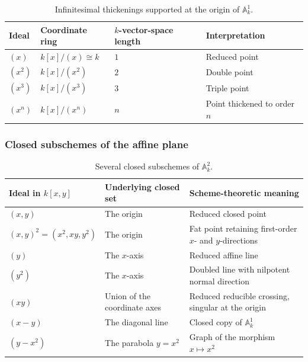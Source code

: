 \documentclass[12pt,a4paper]{article}
\providecommand{\A}{\mathbb A}
\theoremstyle{notespace}
\begin{document}
\begin{table}[htbp]
	\centering
	\renewcommand{\arraystretch}{1.45}
	\begin{tabular}{
			|>{\raggedright\arraybackslash}p{3.7cm}
			|>{\raggedright\arraybackslash}p{4.8cm}
			|>{\centering\arraybackslash}p{3.5cm}
			|>{\raggedright\arraybackslash}p{4.0cm}|
		}
		\hline
		\textbf{Ideal}
		&
		\textbf{Coordinate ring}
		&
		\textbf{\(k\)-vector-space length}
		&
		\textbf{Interpretation}
		\\
		\hline
		
		\((x)\)
		&
		\(\displaystyle k[x]/(x)\cong k\)
		&
		\(1\)
		&
		Reduced point
		\\
		\hline
		
		\((x^2)\)
		&
		\(\displaystyle k[x]/(x^2)\)
		&
		\(2\)
		&
		Double point
		\\
		\hline
		
		\((x^3)\)
		&
		\(\displaystyle k[x]/(x^3)\)
		&
		\(3\)
		&
		Triple point
		\\
		\hline
		
		\((x^n)\)
		&
		\(\displaystyle k[x]/(x^n)\)
		&
		\(n\)
		&
		Point thickened to order \(n\)
		\\
		\hline
	\end{tabular}
	\caption{Infinitesimal thickenings supported at the origin of \(\mathbb{A}^1_k\).}
	\label{tab:infinitesimal-thickenings-origin}
\end{table}

\subsubsection{Closed subschemes of the affine plane}

\begin{table}[htbp]
	\centering
	\renewcommand{\arraystretch}{1.45}
	\begin{tabular}{|p{4.2cm}|p{4.6cm}|p{6.1cm}|}
		\hline
		\textbf{Ideal in \(k[x,y]\)}
		&
		\textbf{Underlying closed set}
		&
		\textbf{Scheme-theoretic meaning}
		\\
		\hline
		\((x,y)\)
		&
		The origin
		&
		Reduced closed point
		\\
		\hline
		\((x,y)^2=(x^2,xy,y^2)\)
		&
		The origin
		&
		Fat point retaining first-order \(x\)- and \(y\)-directions
		\\
		\hline
		\((y)\)
		&
		The \(x\)-axis
		&
		Reduced affine line
		\\
		\hline
		\((y^2)\)
		&
		The \(x\)-axis
		&
		Doubled line with nilpotent normal direction
		\\
		\hline
		\((xy)\)
		&
		Union of the coordinate axes
		&
		Reduced reducible crossing, singular at the origin
		\\
		\hline
		\((x-y)\)
		&
		The diagonal line
		&
		Closed copy of \(\A^1_k\)
		\\
		\hline
		\((y-x^2)\)
		&
		The parabola \(y=x^2\)
		&
		Graph of the morphism \(x\mapsto x^2\)
		\\
		\hline
	\end{tabular}
	\caption{Several closed subschemes of \(\A^2_k\).}
\end{table}
\end{document}
